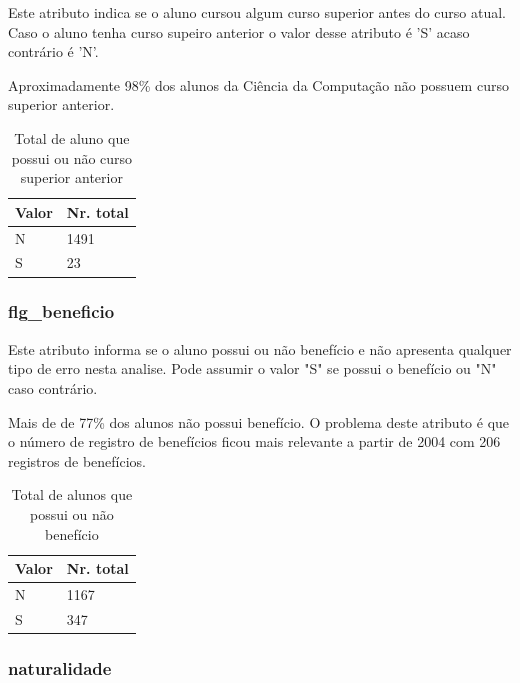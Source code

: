 \documentclass[diss,capa]{texufpel}
\begin{document}
Este atributo indica se o aluno cursou algum curso superior antes do curso atual. Caso o aluno tenha curso supeiro anterior o valor desse atributo é 'S' acaso contrário é 'N'.

Aproximadamente 98\% dos alunos da Ciência da Computação não possuem curso superior anterior.

\begin{table}[htbp]
\begin{center}
\caption{Total de aluno que possui ou não curso superior anterior}
\label{tab:total-aluno-curso-superior-anterior}
\begin{tabular}{p{8.5cm}|p{6cm}} \hline
Valor & Nr. total \\ \hline
N     & 1491 \\
S     &   23 \\ \hline
\end{tabular}
\end{center}
\end{table}

\subsubsection{flg\_beneficio}

Este atributo informa se o aluno possui ou não benefício e não apresenta qualquer tipo de erro nesta analise. Pode assumir o valor "S" se possui o benefício ou "N" caso contrário.

Mais de de 77\% dos alunos não possui benefício.
O problema deste atributo é que o número de registro de benefícios ficou mais relevante a partir de 2004 com 206 registros de benefícios.

\begin{table}[htbp]
\begin{center}
\caption{Total de alunos que possui ou não benefício}
\label{tab:total-aluno-beneficio}
\begin{tabular}{p{8.5cm}|p{6cm}} \hline
Valor & Nr. total \\ \hline
N     & 1167 \\
S     &  347 \\ \hline
\end{tabular}
\end{center}
\end{table}

\subsubsection{naturalidade}
\end{document}
